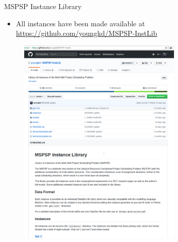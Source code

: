 \documentclass{beamer}
\begin{document}
\begin{frame}{MSPSP Instance Library}
	\begin{itemize}
		\item All instances have been made available at \url{https://github.com/youngkd/MSPSP-InstLib}
	\end{itemize}
	\begin{figure}%
		\centering%
		\includegraphics[width=0.7\textwidth]{images/lib-shot.png}%
	\end{figure}%
\end{frame}
\end{document}
